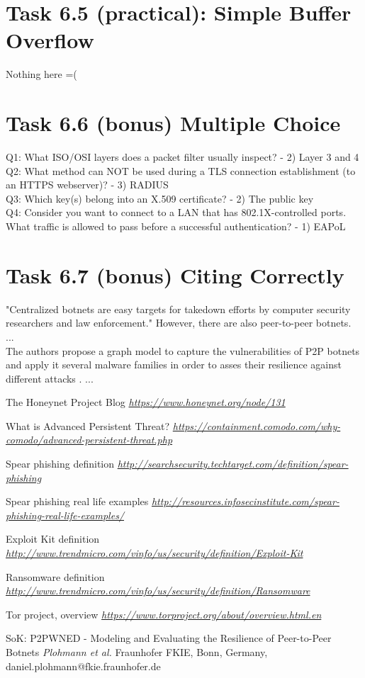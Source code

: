 \documentclass{article}
\begin{document}
\section *{Task 6.5 (practical): Simple Buffer Overflow}
Nothing here =(

\section*{Task 6.6 (bonus) Multiple Choice}
Q1: What ISO/OSI layers does a packet filter usually inspect? - 2) Layer 3 and 4
\\
Q2: What method can NOT be used during a TLS connection establishment (to an HTTPS webserver)? - 3) RADIUS
\\
Q3: Which key(s) belong into an X.509 certificate? - 2) The public key
\\
Q4: Consider you want to connect to a LAN that has 802.1X-controlled ports. What traffic is allowed to pass before a successful authentication? - 1) EAPoL

\section*{Task 6.7 (bonus) Citing Correctly}
"Centralized botnets are easy targets for takedown efforts by computer security researchers and law enforcement." \cite{botnets} However, there are also peer-to-peer botnets.
\\...\\
The authors propose a graph model to capture the vulnerabilities of P2P botnets and apply it several malware families in order to asses their resilience against different attacks \cite{botnets}. ...

\begin{thebibliography}{9}

  The Honeynet Project Blog
  \emph{\url{https://www.honeynet.org/node/131}}
  
  What is Advanced Persistent Threat?
  \emph{\url{https://containment.comodo.com/why-comodo/advanced-persistent-threat.php}}
  
  Spear phishing definition
  \emph{\url{http://searchsecurity.techtarget.com/definition/spear-phishing}}
  
  Spear phishing real life examples
  \emph{\url{http://resources.infosecinstitute.com/spear-phishing-real-life-examples/}}

  Exploit Kit definition
  \emph{\url{http://www.trendmicro.com/vinfo/us/security/definition/Exploit-Kit}}
  
  Ransomware definition
  \emph{\url{http://www.trendmicro.com/vinfo/us/security/definition/Ransomware}}
 
  Tor project, overview
  \emph{\url{https://www.torproject.org/about/overview.html.en}}
  
  SoK: P2PWNED - Modeling and Evaluating the Resilience of Peer-to-Peer Botnets
  \emph{Plohmann et al.}
  Fraunhofer FKIE, Bonn, Germany, daniel.plohmann@fkie.fraunhofer.de
    
\end{thebibliography}
\end{document}
